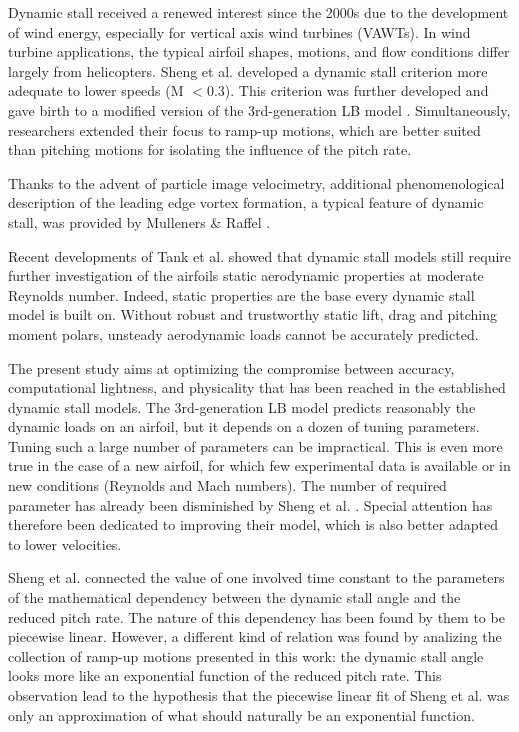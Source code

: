 Dynamic stall received a renewed interest since the 2000s due to the development of wind energy, especially for vertical axis wind turbines (VAWTs). In wind turbine applications, the typical airfoil shapes, motions, and flow conditions differ largely from helicopters. Sheng et al. developed a dynamic stall criterion more adequate to lower speeds (M $<0.3$). This criterion was further developed \cite{sheng_improved_2007} and gave birth to a modified version of the 3rd-generation LB model \cite{sheng_modified_2008}. Simultaneously, researchers extended their focus to ramp-up motions, which are better suited than pitching motions for isolating the influence of the pitch rate. 

Thanks to the advent of particle image velocimetry, additional phenomenological description of the leading edge vortex formation, a typical feature of dynamic stall, was provided by Mulleners \& Raffel \cite{mulleners_dynamic_2013}. 

Recent developments of Tank et al. \cite{tank_possibility_2017} showed that dynamic stall models still require further investigation of the airfoils static aerodynamic properties at moderate Reynolds number. Indeed, static properties are the base every dynamic stall model is built on. Without robust and trustworthy static lift, drag and pitching moment polars, unsteady aerodynamic loads cannot be accurately predicted. 


The present study aims at optimizing the compromise between accuracy, computational lightness, and physicality that has been reached in the established dynamic stall models. 
The 3rd-generation LB model predicts reasonably the dynamic loads on an airfoil, but it depends on a dozen of tuning parameters. 
Tuning such a large number of parameters can be impractical. This is even more true in the case of a new airfoil, for which few experimental data is available or in new conditions (Reynolds and Mach numbers). The number of required parameter has already been disminished by Sheng et al. \cite{sheng_modified_2008}. Special attention has therefore been dedicated to improving their model, which is also better adapted to lower velocities.  

Sheng et al. \cite{sheng_improved_2007} connected the value of one involved time constant to the parameters of the mathematical dependency between the dynamic stall angle and the reduced pitch rate. 
The nature of this dependency has been found by them to be piecewise linear. 
However, a different kind of relation was found by analizing the collection of ramp-up motions presented in this work: the dynamic stall angle looks more like an exponential function of the reduced pitch rate. 
This observation lead to the hypothesis that the piecewise linear fit of Sheng et al. was only an approximation of what should naturally be an exponential function. 

